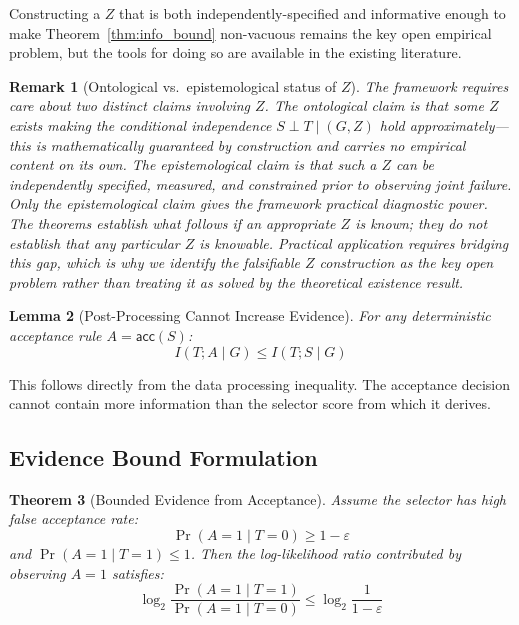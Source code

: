 \documentclass[11pt]{article}
\newtheorem{theorem}{Theorem}[section]
\newtheorem{lemma}[theorem]{Lemma}
\newtheorem{remark}[theorem]{Remark}
\begin{document}
Constructing a $Z$ that is both independently-specified and informative enough to make
Theorem~\ref{thm:info_bound} non-vacuous remains the key open empirical problem, but the
tools for doing so are available in the existing literature.

\begin{remark}[Ontological vs.\ epistemological status of $Z$]
\label{rem:z_ontology}
The framework requires care about two distinct claims involving $Z$. The \emph{ontological}
claim is that some $Z$ exists making the conditional independence $S \perp T \mid (G, Z)$
hold approximately---this is mathematically guaranteed by construction and carries no
empirical content on its own. The \emph{epistemological} claim is that such a $Z$ can be
independently specified, measured, and constrained prior to observing joint failure. Only
the epistemological claim gives the framework practical diagnostic power. The theorems
establish what follows \emph{if} an appropriate $Z$ is known; they do not establish that
any particular $Z$ is knowable. Practical application requires bridging this gap, which is
why we identify the falsifiable $Z$ construction as the key open problem rather than
treating it as solved by the theoretical existence result.
\end{remark}

\begin{lemma}[Post-Processing Cannot Increase Evidence]
\label{lem:post_processing}
For any deterministic acceptance rule $A = \mathsf{acc}(S)$:
\begin{equation}
I(T; A \mid G) \leq I(T; S \mid G)
\end{equation}
\end{lemma}

This follows directly from the data processing inequality. The acceptance decision cannot
contain more information than the selector score from which it derives.

\subsection{Evidence Bound Formulation}

\begin{theorem}[Bounded Evidence from Acceptance]
\label{thm:evidence_bound}
Assume the selector has high false acceptance rate:
\begin{equation}
\Pr(A = 1 \mid T = 0) \geq 1 - \varepsilon
\end{equation}
and $\Pr(A = 1 \mid T = 1) \leq 1$. Then the log-likelihood ratio contributed by observing
$A = 1$ satisfies:
\begin{equation}
\log_2 \frac{\Pr(A = 1 \mid T = 1)}{\Pr(A = 1 \mid T = 0)} \leq \log_2 \frac{1}{1 - \varepsilon}
\end{equation}
\end{theorem}
\end{document}
